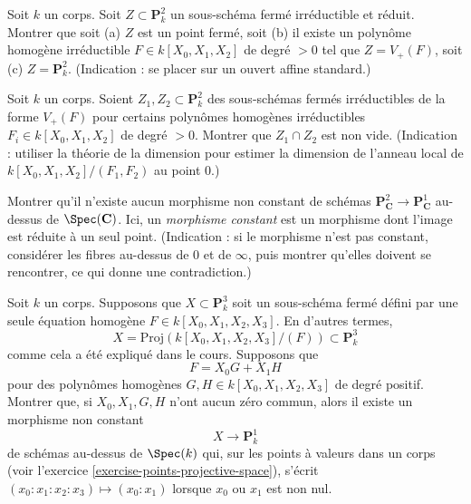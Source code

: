 \begin{exercise}
\label{exercise-curve-projective-plane}
Soit $k$ un corps. Soit $Z \subset \mathbf{P}^2_k$ un
sous-schéma fermé irréductible et réduit.
Montrer que soit (a) $Z$ est un point fermé, soit (b) il existe
un polynôme homogène irréductible $F \in k[X_0, X_1, X_2]$ de degré $> 0$
tel que $Z = V_{+}(F)$, soit (c) $Z = \mathbf{P}^2_k$.
(Indication : se placer sur un ouvert affine standard.)
\end{exercise}

\begin{exercise}
\label{exercise-bezout}
Soit $k$ un corps. Soient $Z_1, Z_2 \subset \mathbf{P}^2_k$ des
sous-schémas fermés irréductibles de la forme $V_{+}(F)$
pour certains polynômes homogènes irréductibles $F_i \in k[X_0, X_1, X_2]$ de degré $> 0$.
Montrer que $Z_1 \cap Z_2$ est non vide.
(Indication : utiliser la théorie de la dimension pour estimer la dimension de
l'anneau local de $k[X_0, X_1, X_2]/(F_1, F_2)$ au point $0$.)
\end{exercise}

\begin{exercise}
\label{exercise-no-nonconstant-morphism-proj}
Montrer qu'il n'existe aucun morphisme non constant de schémas
$\mathbf{P}^2_{\mathbf{C}} \to \mathbf{P}^1_{\mathbf{C}}$
au-dessus de $\Spec(\mathbf{C})$. Ici, un {\it morphisme constant} est
un morphisme dont l'image est réduite à un seul point.
(Indication : si le morphisme n'est pas constant, considérer les fibres au-dessus de
$0$ et de $\infty$, puis montrer qu'elles doivent se rencontrer, ce qui donne une contradiction.)
\end{exercise}

\begin{exercise}
\label{exercise-nonconstant-morphism}
Soit $k$ un corps.
Supposons que $X \subset \mathbf{P}^3_k$ soit un sous-schéma fermé
défini par une seule équation homogène $F \in k[X_0, X_1, X_2, X_3]$.
En d'autres termes,
$$
X = \text{Proj}(k[X_0, X_1, X_2, X_3]/(F)) \subset \mathbf{P}^3_k
$$
comme cela a été expliqué dans le cours. Supposons que
$$
F = X_0 G + X_1 H
$$
pour des polynômes homogènes $G, H \in k[X_0, X_1, X_2, X_3]$
de degré positif. Montrer que, si $X_0, X_1, G, H$ n'ont aucun zéro commun,
alors il existe un morphisme non constant
$$
X \longrightarrow \mathbf{P}^1_k
$$
de schémas au-dessus de $\Spec(k)$
qui, sur les points à valeurs dans un corps (voir l'exercice \ref{exercise-points-projective-space}),
s'écrit $(x_0 : x_1 : x_2 : x_3) \mapsto (x_0 : x_1)$ lorsque
$x_0$ ou $x_1$ est non nul.
\end{exercise}





